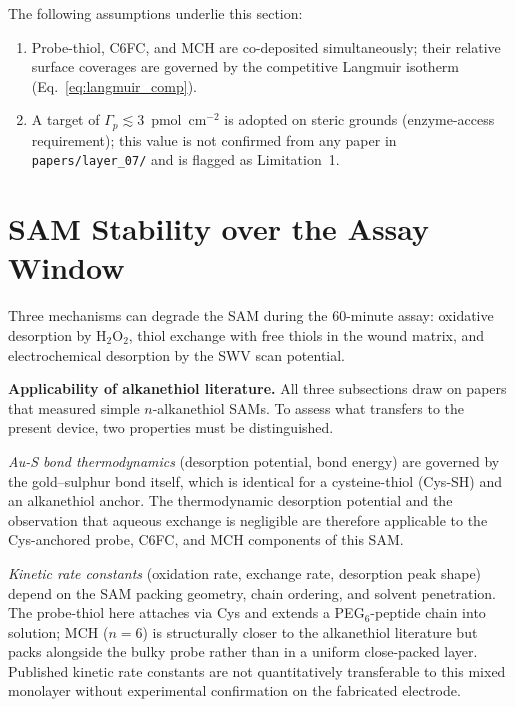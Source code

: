 \documentclass[10pt,a4paper]{article}
\numberwithin{equation}{section}
\begin{document}
The following assumptions underlie this section:

\begin{enumerate}[noitemsep]
  \item Probe-thiol, C6FC, and MCH are co-deposited simultaneously; their relative
    surface coverages are governed by the competitive Langmuir isotherm
    (Eq.~\eqref{eq:langmuir_comp}).
  \item A target of $\Gamma_p \lesssim 3$~pmol~cm$^{-2}$ is adopted on steric grounds
    (enzyme-access requirement); this value is not confirmed from any paper in
    \texttt{papers/layer\_07/} and is flagged as Limitation~1.
\end{enumerate}

\section{SAM Stability over the Assay Window}
\label{sec:stability}

Three mechanisms can degrade the SAM during the 60-minute assay: oxidative desorption
by H$_2$O$_2$, thiol exchange with free thiols in the wound matrix, and electrochemical
desorption by the SWV scan potential.

\textbf{Applicability of alkanethiol literature.} All three subsections draw on papers
that measured simple $n$-alkanethiol SAMs. To assess what transfers to the present
device, two properties must be distinguished.

\emph{Au-S bond thermodynamics} (desorption potential, bond energy) are governed by the
gold--sulphur bond itself, which is identical for a cysteine-thiol (Cys-SH) and an
alkanethiol anchor. The thermodynamic desorption potential and the observation that
aqueous exchange is negligible are therefore applicable to the Cys-anchored probe,
C6FC, and MCH components of this SAM.

\emph{Kinetic rate constants} (oxidation rate, exchange rate, desorption peak shape)
depend on the SAM packing geometry, chain ordering, and solvent penetration. The
probe-thiol here attaches via Cys and extends a PEG$_6$-peptide chain into solution;
MCH ($n = 6$) is structurally closer to the alkanethiol literature but packs alongside
the bulky probe rather than in a uniform close-packed layer. Published kinetic rate
constants are not quantitatively transferable to this mixed monolayer without
experimental confirmation on the fabricated electrode.
\end{document}
